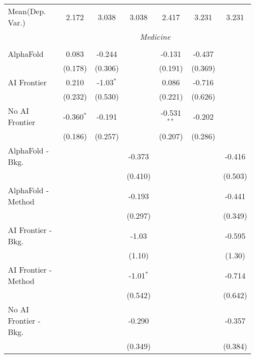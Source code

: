 \begin{tabular}{lcccccc}
Mean(Dep. Var.) & 2.172 & 3.038 & 3.038 & 2.417 & 3.231 & 3.231 \\
 & \multicolumn{6}{c}{\textit{Medicine}} \\ \\
   AlphaFold               & 0.083        & -0.244      &             & -0.131        & -0.437  &   \\   
                           & (0.178)      & (0.306)     &             & (0.191)       & (0.369) &   \\   
   AI Frontier             & 0.210        & -1.03$^{*}$ &             & 0.086         & -0.716  &   \\   
                           & (0.232)      & (0.530)     &             & (0.221)       & (0.626) &   \\   
   No AI Frontier          & -0.360$^{*}$ & -0.191      &             & -0.531$^{**}$ & -0.202  &   \\   
                           & (0.186)      & (0.257)     &             & (0.207)       & (0.286) &   \\   
   AlphaFold - Bkg.        &              &             & -0.373      &               &         & -0.416\\   
                           &              &             & (0.410)     &               &         & (0.503)\\   
   AlphaFold - Method      &              &             & -0.193      &               &         & -0.441\\   
                           &              &             & (0.297)     &               &         & (0.349)\\   
   AI Frontier - Bkg.      &              &             & -1.03       &               &         & -0.595\\   
                           &              &             & (1.10)      &               &         & (1.30)\\   
   AI Frontier - Method    &              &             & -1.01$^{*}$ &               &         & -0.714\\   
                           &              &             & (0.542)     &               &         & (0.642)\\   
   No AI Frontier - Bkg.   &              &             & -0.290      &               &         & -0.357\\   
                           &              &             & (0.349)     &               &         & (0.384)\\   

\end{tabular}
